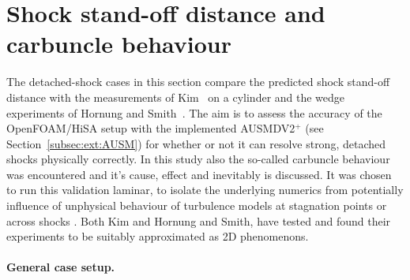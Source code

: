 \section{Shock stand-off distance and carbuncle behaviour}
\label{sec:numerical-vv:shock-stand-off-carbuncle}

The detached-shock cases in this section compare the predicted shock stand-off distance with
the measurements of Kim~\citep{Kim1956CircularCylinder} on a cylinder and
the wedge experiments of Hornung and Smith~\citep{HornungSmith1979ShockDetachment}.
The aim is to assess the accuracy of the OpenFOAM/HiSA setup with the implemented
AUSMDV2\(^+\) (see Section~\ref{subsec:ext:AUSM}) for whether or not it can resolve strong, detached shocks physically correctly. In this study also the so-called carbuncle behaviour was encountered and it's cause, effect and inevitably is discussed. It was chosen to run this validation laminar, to isolate the underlying numerics from potentially influence of unphysical behaviour of turbulence models at stagnation points \cite{durbin1996k} or across shocks \cite{tian2023correction}. Both Kim and Hornung and Smith, have tested and found their experiments to be suitably approximated as 2D phenomenons.

\paragraph{General case setup.}

